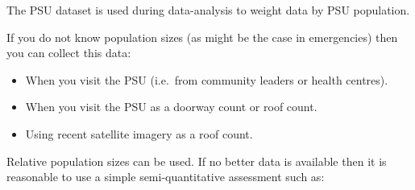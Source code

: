 \documentclass[12pt,a4paper]{book}
\theoremstyle{definition}
\theoremstyle{definition}
\theoremstyle{definition}
\theoremstyle{remark}
\begin{document}
The PSU dataset is used during data-analysis to weight data by PSU
population.

If you do not know population sizes (as might be the case in
emergencies) then you can collect this data:

\begin{itemize}
\item
  When you visit the PSU (i.e.~from community leaders or health
  centres).
\item
  When you visit the PSU as a doorway count or roof count.
\item
  Using recent satellite imagery as a roof count.
\end{itemize}

Relative population sizes can be used. If no better data is available
then it is reasonable to use a simple semi-quantitative assessment such
as:
\end{document}
